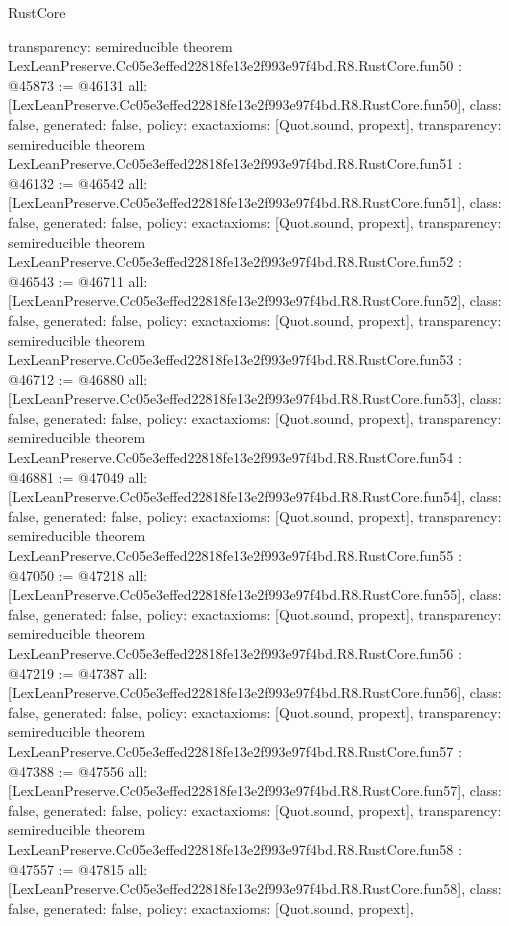\begin{lexlean}{RustCore}
\begin{coremodule}
{  transparency: semireducible
}
theorem LexLeanPreserve.Cc05e3effed22818fe13e2f993e97f4bd.R8.RustCore.fun50 : @45873 := @46131 {
  all: [LexLeanPreserve.Cc05e3effed22818fe13e2f993e97f4bd.R8.RustCore.fun50],
  class: false,
  generated: false,
  policy: exact{axioms: [Quot.sound, propext]},
  transparency: semireducible
}
theorem LexLeanPreserve.Cc05e3effed22818fe13e2f993e97f4bd.R8.RustCore.fun51 : @46132 := @46542 {
  all: [LexLeanPreserve.Cc05e3effed22818fe13e2f993e97f4bd.R8.RustCore.fun51],
  class: false,
  generated: false,
  policy: exact{axioms: [Quot.sound, propext]},
  transparency: semireducible
}
theorem LexLeanPreserve.Cc05e3effed22818fe13e2f993e97f4bd.R8.RustCore.fun52 : @46543 := @46711 {
  all: [LexLeanPreserve.Cc05e3effed22818fe13e2f993e97f4bd.R8.RustCore.fun52],
  class: false,
  generated: false,
  policy: exact{axioms: [Quot.sound, propext]},
  transparency: semireducible
}
theorem LexLeanPreserve.Cc05e3effed22818fe13e2f993e97f4bd.R8.RustCore.fun53 : @46712 := @46880 {
  all: [LexLeanPreserve.Cc05e3effed22818fe13e2f993e97f4bd.R8.RustCore.fun53],
  class: false,
  generated: false,
  policy: exact{axioms: [Quot.sound, propext]},
  transparency: semireducible
}
theorem LexLeanPreserve.Cc05e3effed22818fe13e2f993e97f4bd.R8.RustCore.fun54 : @46881 := @47049 {
  all: [LexLeanPreserve.Cc05e3effed22818fe13e2f993e97f4bd.R8.RustCore.fun54],
  class: false,
  generated: false,
  policy: exact{axioms: [Quot.sound, propext]},
  transparency: semireducible
}
theorem LexLeanPreserve.Cc05e3effed22818fe13e2f993e97f4bd.R8.RustCore.fun55 : @47050 := @47218 {
  all: [LexLeanPreserve.Cc05e3effed22818fe13e2f993e97f4bd.R8.RustCore.fun55],
  class: false,
  generated: false,
  policy: exact{axioms: [Quot.sound, propext]},
  transparency: semireducible
}
theorem LexLeanPreserve.Cc05e3effed22818fe13e2f993e97f4bd.R8.RustCore.fun56 : @47219 := @47387 {
  all: [LexLeanPreserve.Cc05e3effed22818fe13e2f993e97f4bd.R8.RustCore.fun56],
  class: false,
  generated: false,
  policy: exact{axioms: [Quot.sound, propext]},
  transparency: semireducible
}
theorem LexLeanPreserve.Cc05e3effed22818fe13e2f993e97f4bd.R8.RustCore.fun57 : @47388 := @47556 {
  all: [LexLeanPreserve.Cc05e3effed22818fe13e2f993e97f4bd.R8.RustCore.fun57],
  class: false,
  generated: false,
  policy: exact{axioms: [Quot.sound, propext]},
  transparency: semireducible
}
theorem LexLeanPreserve.Cc05e3effed22818fe13e2f993e97f4bd.R8.RustCore.fun58 : @47557 := @47815 {
  all: [LexLeanPreserve.Cc05e3effed22818fe13e2f993e97f4bd.R8.RustCore.fun58],
  class: false,
  generated: false,
  policy: exact{axioms: [Quot.sound, propext]},
}
\end{coremodule}
\end{lexlean}

